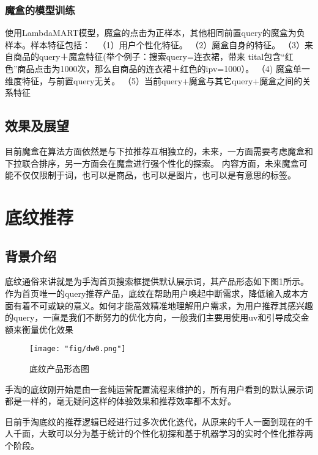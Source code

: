 \subsubsection{魔盒的模型训练}
使用LambdaMART模型，魔盒的点击为正样本，其他相同前置query的魔盒为负样本。样本特征包括：  （1）用户个性化特征。 （2）魔盒自身的特征。 （3）来自商品的query＋魔盒特征(举个例子：搜索query=连衣裙，带来 tital包含“红色”商品点击为1000次，那么自商品的连衣裙＋红色的ipv=1000）。 （4) 魔盒单一维度特征，与前置query无关。 （5）当前query+魔盒与其它query+魔盒之间的关系特征
\subsection{效果及展望}
目前魔盒在算法方面依然是与下拉推荐互相独立的，未来，一方面需要考虑魔盒和下拉联合排序，另一方面会在魔盒进行强个性化的探索。
内容方面，未来魔盒可能不仅仅限制于词，也可以是商品，也可以是图片，也可以是有意思的标签。

\section{底纹推荐}
\subsection{背景介绍}
底纹通俗来讲就是为手淘首页搜索框提供默认展示词，其产品形态如下图1所示。作为首页唯一的query推荐产品，底纹在帮助用户唤起中断需求，降低输入成本方面有着不可或缺的意义。如何才能高效精准地理解用户需求，为用户推荐其感兴趣的query，一直是我们不断努力的优化方向，一般我们主要用使用uv和引导成交金额来衡量优化效果
\begin{figure}[!h]
	\centering
	\texttt{[image: "fig/dw0.png"]}
	\caption{底纹产品形态图}
	\label{fig:dw0}
\end{figure}
手淘的底纹刚开始是由一套纯运营配置流程来维护的，所有用户看到的默认展示词都是一样的，毫无疑问这样的体验效果和推荐效率都不太好。
\par 目前手淘底纹的推荐逻辑已经进行过多次优化迭代，从原来的千人一面到现在的千人千面，大致可以分为基于统计的个性化初探和基于机器学习的实时个性化推荐两个阶段。

